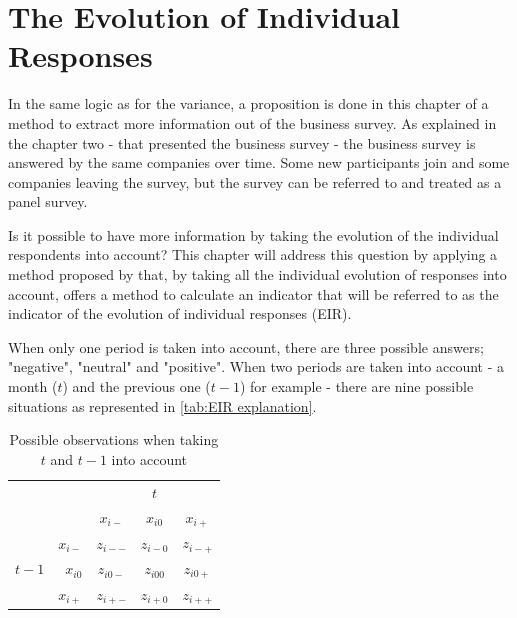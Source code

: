 \documentclass[12pt,a4paper,oneside]{book}
\begin{document}
\chapter{The Evolution of Individual Responses}

In the same logic as for the variance, a proposition is done in this chapter of a method to extract more information out of the business survey. 
As explained in the chapter two - that presented the business survey - the business survey is answered by the same companies over time. Some new participants join and some companies leaving the survey, but the survey can be referred to and treated as a panel survey.

Is it possible to have more information by taking the evolution of the individual respondents into account? 
This chapter will address this question by applying a method proposed by \cite{caron_estimation_1996} that, by taking all the individual evolution of responses into account, offers a method to calculate an indicator that will be referred to as the indicator of the evolution of individual responses (EIR).


When only one period is taken into account, there are three possible answers; "negative", "neutral" and "positive".
When two periods are taken into account - a month ($t$) and the previous one ($t-1$) for example - there are nine possible situations as represented in \autoref{tab:EIR explanation}. 


\begin{table}[htp!]
    \caption{Possible observations when taking $t$ and $t-1$ into account}
    \label{tab:EIR explanation}
     \centering \footnotesize
    \begin{tabular}{r | r | c c c | }
    \multicolumn{1}{r}{} & \multicolumn{1}{r}{} &    \multicolumn{3}{c}{$t$} \\ \cline{3-5}
    \multicolumn{1}{r}{} &         & \textbf{$x_{i-}$} & \textbf{$x_{i0}$} & \textbf{$x_{i+}$} \\ \cline{2-5}
          &    \textbf{$x_{i-}$} & $z_{i--}$    & $z_{i-0}$    & $z_{i-+}$ \\ 
    $t-1$ & \textbf{$x_{i0}$}  & $z_{i0-}$    & $z_{i00}$    & $z_{i0+}$ \\
          &    \textbf{$x_{i+}$} & $z_{i+-}$    & $z_{i+0}$    & $z_{i++}$ \\ \cline{2-5}
    \end{tabular}
\end{table}
\end{document}
